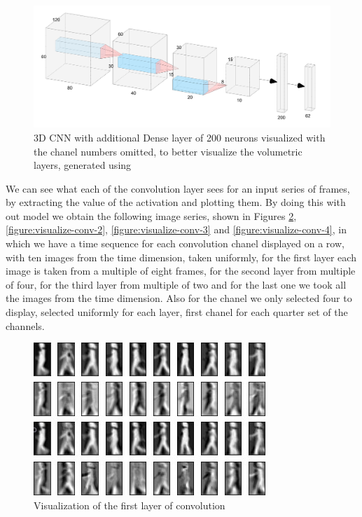 \documentclass[12pt]{article}
\theoremstyle{definition}
\begin{document}
	\begin{figure}
		\includegraphics[width=\textwidth]{networks/3D-CNN-200-Dense.png}
		\caption{3D CNN with additional Dense layer of 200 neurons visualized with the chanel numbers omitted, to better visualize the volumetric layers, generated using \cite{nn-svg}}
		\label{figure:3D-CNN-200-Dense}
	\end{figure}

	We can see what each of the convolution layer sees for an input series of frames, by extracting the value of the activation and plotting them. By doing this with out model we obtain the following image series, shown in Figures \ref{figure:visualize-conv-1}, \ref{figure:visualize-conv-2}, \ref{figure:visualize-conv-3} and \ref{figure:visualize-conv-4}, in which we have a time sequence for each convolution chanel displayed on a row, with ten images from the time dimension, taken uniformly, for the first layer each image is taken from a multiple of eight frames, for the second layer from multiple of four, for the third layer from multiple of two and for the last one we took all the images from the time dimension. Also for the chanel we only selected four to display, selected uniformly for each layer, first chanel for each quarter set of the channels.

	\begin{figure}[ht]
		\includegraphics[width=\textwidth]{conv-see/visualization-2.jpg}
		\caption{Visualization of the first layer of convolution}
		\label{figure:visualize-conv-1}
	\end{figure}
\end{document}

